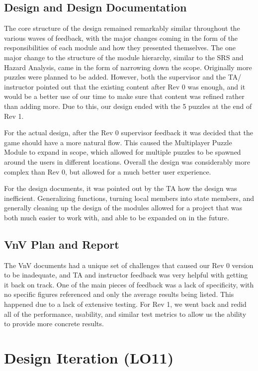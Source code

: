 \documentclass{article}
\begin{document}
\subsection{Design and Design Documentation}

The core structure of the design remained remarkably similar throughout the various waves of feedback, with the major changes coming in the form of the responsibilities of each module and how they presented themselves. The one major change to the structure of the module hierarchy, similar to the SRS and Hazard Analysis, came in the form of narrowing down the scope. Originally more puzzles were planned to be added. However, both the supervisor and the TA/ instructor pointed out that the existing content after Rev 0 was enough, and it would be a better use of our time to make sure that content was refined rather than adding more. Due to this, our design ended with the 5 puzzles at the end of Rev 1. 

For the actual design, after the Rev 0 supervisor feedback it was decided that the game should have a more natural flow. This caused the Multiplayer Puzzle Module to expand in scope, which allowed for multiple puzzles to be spawned around the users in different locations. Overall the design was considerably more complex than Rev 0, but allowed for a much better user experience. 

For the design documents, it was pointed out by the TA how the design was inefficient. Generalizing functions, turning local members into state members, and generally cleaning up the design of the modules allowed for a project that was both much easier to work with, and able to be expanded on in the future. 

\subsection{VnV Plan and Report}

The VnV documents had a unique set of challenges that caused our Rev 0 version to be inadequate, and TA and instructor feedback was very helpful with getting it back on track. One of the main pieces of feedback was a lack of specificity, with no specific figures referenced and only the average results being listed. This happened due to a lack of extensive testing. For Rev 1, we went back and redid all of the performance, usability, and similar test metrics to allow us the ability to provide more concrete results. 

\section{Design Iteration (LO11)}
\end{document}
